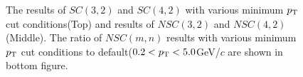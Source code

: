 \begin{figure}[p]
\begin{center}
        \caption{The results of $SC(3,2)$ and $SC(4,2)$ with various minimum $p_{\rm{T}}$ cut conditions(Top) and results of  $NSC(3,2)$ and $NSC(4,2)$(Middle). The ratio of $NSC(m,n)$ results with various minimum $p_{\rm{T}}$ cut conditions to default($0.2 < p_{\rm{T}} < 5.0$GeV/$c$ are shown in bottom figure.}
        \label{fig:ptdephigh}
        \end{center}   
     \end{figure}


